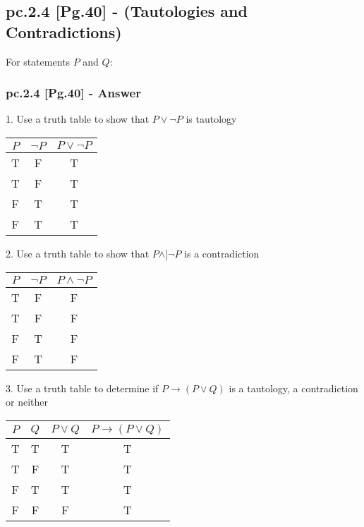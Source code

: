 \subsection{pc.2.4 [Pg.40] - (Tautologies and Contradictions)}

For statements $P$ and $Q$: \\

\subsubsection*{pc.2.4 [Pg.40] - Answer}
1. Use a truth table to show that $P \vee \neg P$ is tautology \\

\begin{center}
\begin{tabular}{|c|c|c|}
\hline 
$P$ & $\neg P$ & $P \vee \neg P$ \\ 
\hline 
T & F & T \\ 
\hline 
T & F & T \\ 
\hline 
F & T & T \\ 
\hline 
F & T & T \\ 
\hline 
\end{tabular} 
\end{center}

2. Use a truth table to show that $P \wedge ]\neg P$ is a contradiction \\

\begin{center}
\begin{tabular}{|c|c|c|}
\hline 
$P$ & $\neg P$ & $P \wedge \neg P$ \\ 
\hline 
T & F & F \\ 
\hline 
T & F & F \\ 
\hline 
F & T & F \\ 
\hline 
F & T & F \\ 
\hline 
\end{tabular} 
\end{center}

3. Use a truth table to determine if $P \to (P \vee Q)$ is a tautology, a contradiction or neither \\

\begin{center}
\begin{tabular}{|c|c|c|c|}
\hline 
$P$ & $Q$ & $P \vee Q$ & $P \to (P \vee Q)$ \\ 
\hline 
T & T & T & T \\ 
\hline 
T & F & T & T \\ 
\hline 
F & T & T & T \\ 
\hline 
F & F & F & T \\ 
\hline 
\end{tabular} 
\end{center}

